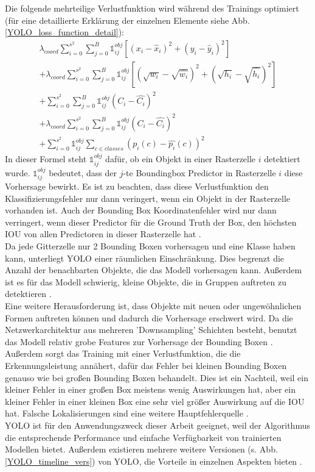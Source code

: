 {{	Die folgende mehrteilige Verlustfunktion wird während des Trainings optimiert (für eine detaillierte Erklärung der einzelnen Elemente siehe Abb. \ref{YOLO_loss_function_detail}):
	\begin{multline}
		\lambda_{coord} \sum_{i=0}^{s^2} \sum_{j=0}^{B} \mathbb{1}_{i j}^{obj}\left[(x_i-\hat{x}_i)^2 + (y_i - \hat{y}_i)^2\right]\\
		+ \lambda_{coord} \sum_{i=0}^{s^2} \sum_{j=0}^{B} \mathbb{1}_{i j}^{obj}\left[\left(\sqrt{w_i} - \sqrt{\hat{w_i}}\right)^2 + \left(\sqrt{h_i}-\sqrt{\hat{h_i}}\right)^2\right]\\
		+ \sum_{i=0}^{s^2} \sum_{j=0}^{B} \mathbb{1}_{i j}^{obj}\left(C_i - \hat{C_i}\right)^2\\
		+ \lambda_{coord} \sum_{i=0}^{s^2} \sum_{j=0}^{B} \mathbb{1}_{i j}^{obj}\left(C_i - \hat{C_i}\right)^2\\
		+ \sum_{i=0}^{s^2} \mathbb{1}_{i j}^{obj} \sum_{c \in classes } \left(p_i(c)-\hat{p_i}(c)\right)^2
	\end{multline} 
	 In dieser Formel steht $\mathbb{1}_{i j}^{obj}$ dafür, ob ein Objekt in einer Rasterzelle $i$ detektiert wurde. $\mathbb{1}_{i j}^{obj}$ bedeutet, dass der $j$-te Boundingbox Predictor in Rasterzelle $i$ diese Vorhersage bewirkt. Es ist zu beachten, dass diese Verlustfunktion den Klassifizierungsfehler nur dann veringert, wenn ein Objekt in der Rasterzelle vorhanden ist. Auch der Bounding Box Koordinatenfehler wird nur dann verringert, wenn dieser Predictor für die Ground Truth der Box, den höchsten IOU von allen Predictoren in dieser Rasterzelle hat \citep{Redmon2016}. \\
	Da jede Gitterzelle nur 2 Bounding Boxen vorhersagen und eine Klasse haben kann, unterliegt YOLO einer räumlichen Einschränkung. Dies begrenzt die Anzahl der benachbarten Objekte, die das Modell vorhersagen kann. Außerdem ist es für das Modell schwierig, kleine Objekte, die in Gruppen auftreten zu detektieren \citep{Redmon2016}. \\
	Eine weitere Herausforderung ist, dass Objekte mit neuen oder ungewöhnlichen Formen auftreten können und dadurch die Vorhersage erschwert wird. Da die Netzwerkarchitektur aus mehreren 'Downsampling' Schichten besteht, benutzt das Modell relativ grobe Features zur Vorhersage der Bounding Boxen \citep{Redmon2016}. \\
	Außerdem sorgt das Training mit einer Verlustfunktion, die die Erkennungsleistung annähert, dafür das Fehler bei kleinen Bounding Boxen genauso wie bei großen Bounding Boxen behandelt. Dies ist ein Nachteil, weil ein kleiner Fehler in einer großen Box meistens wenig Auswirkungen hat, aber ein kleiner Fehler in einer kleinen Box eine sehr viel größer Auswirkung auf die IOU hat. Falsche Lokalisierungen sind eine weitere Hauptfehlerquelle \citep{Redmon2016}. \\
	YOLO ist für den Anwendungszweck dieser Arbeit geeignet, weil der Algorithmus die entsprechende Performance und einfache Verfügbarkeit von trainierten Modellen bietet. Außerdem existieren mehrere weitere Versionen (s. Abb. \ref{YOLO_timeline_vers}) von YOLO, die Vorteile in einzelnen Aspekten bieten \citep{Terven2023}. \\

}}
